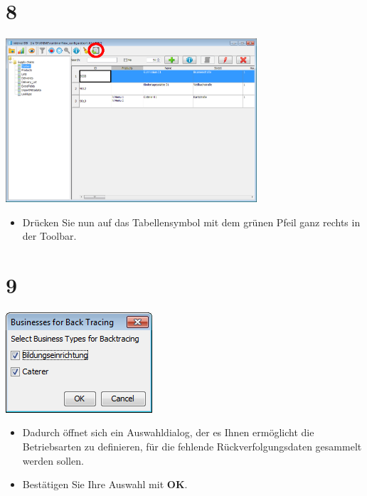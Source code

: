 \documentclass{beamer}
\begin{document}
\section{8}
\begin{frame}
	\begin{center}
  		\includegraphics[width=0.7\textwidth]{8.png}
	\end{center}
	\begin{itemize}
		\item Drücken Sie nun auf das Tabellensymbol mit dem grünen Pfeil ganz rechts in der Toolbar.
	\end{itemize}
\end{frame}

\section{9}
\begin{frame}
	\begin{center}
  		\includegraphics[height=0.5\textheight]{9.png}
	\end{center}
	\begin{itemize}
		\item Dadurch öffnet sich ein Auswahldialog, der es Ihnen ermöglicht die Betriebsarten zu definieren, für die fehlende Rückverfolgungsdaten gesammelt werden sollen.
		\item Bestätigen Sie Ihre Auswahl mit \textbf{OK}.
	\end{itemize}
\end{frame}
\end{document}
